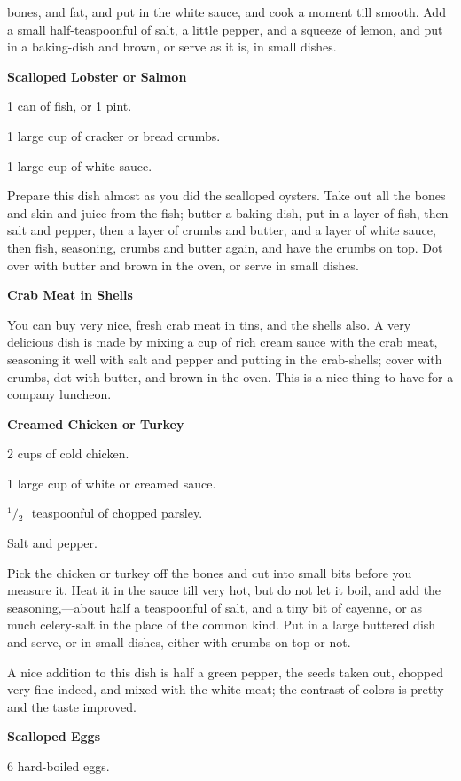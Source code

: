 \documentclass[11pt]{book}
\newcommand{\indpar}{\par\noindent\hspace*{\parindent}}
\newcommand{\ingredient}{\indpar}
\newcommand{\instruction}{\indpar}
\newcommand{\OneHalf}{\ensuremath{{}^1\!\!/\!{}_2\mbox{\ }}}
\newenvironment{RecipeTitle}{\medskip\begin{center}\large\bf }{\end{center}\smallskip}
\begin{document}
bones, and fat, and put in the white sauce, and cook a
moment till smooth.  Add a small half-teaspoonful of salt,
a little pepper, and a squeeze of lemon, and put in a
baking-dish and brown, or serve as it is, in small dishes.
\begin{RecipeTitle}
Scalloped Lobster or Salmon\label{scalloped_lobster_or_salmon}
\end{RecipeTitle}
\ingredient  1 can of fish, or 1 pint.
\ingredient  1 large cup of cracker or bread crumbs.
\ingredient  1 large cup of white sauce.
\instruction
  Prepare this dish almost as you did the scalloped
oysters.  Take out all the bones and skin and juice
from the fish; butter a baking-dish, put in a layer of
fish, then salt and pepper, then a layer of crumbs and
butter, and a layer of white sauce, then fish, seasoning,
crumbs and butter again, and have the crumbs on top.
Dot over with butter and brown in the oven, or serve in
small dishes.
\begin{RecipeTitle}
Crab Meat in Shells\label{crab_meat_in_shells}
\end{RecipeTitle}
\instruction
  You can buy very nice, fresh crab meat in tins, and the
shells also.  A very delicious dish is made by mixing a cup
of rich cream sauce with the crab meat, seasoning it well
with salt and pepper and putting in the crab-shells;
cover with crumbs, dot with butter, and brown in the oven.
This is a nice thing to have for a company luncheon.
\begin{RecipeTitle}
Creamed Chicken or Turkey\label{creamed_chicken_or_turkey}
\end{RecipeTitle}
\ingredient  2 cups of cold chicken.
\ingredient  1 large cup of white or creamed sauce.
\ingredient  \OneHalf teaspoonful of chopped parsley.
\ingredient  Salt and pepper.
\instruction
  Pick the chicken or turkey off the bones and cut into
small bits before you measure it.  Heat it in the sauce
till very hot, but do not let it boil, and add the
seasoning,---about half a teaspoonful of salt, and a
tiny bit of cayenne, or as much celery-salt in the place
of the common kind.  Put in a large buttered dish and
serve, or in small dishes, either with crumbs on top or not.
\instruction
  A nice addition to this dish is half a green pepper, the
seeds taken out, chopped very fine indeed, and mixed with
the white meat; the contrast of colors is pretty and the
taste improved.
\begin{RecipeTitle}
Scalloped Eggs\label{scalloped_eggs}
\end{RecipeTitle}
\ingredient  6 hard-boiled eggs.
\end{document}
